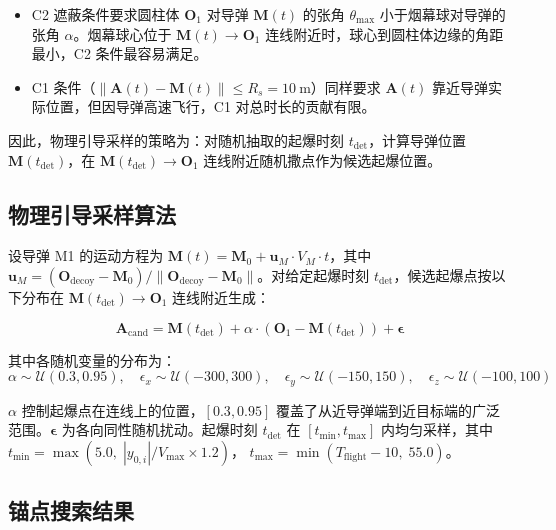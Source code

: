 \documentclass[12pt,a4paper]{ctexart}
\newcommand{\tdet}{t_{\text{det}}}
\begin{document}
\begin{itemize}
    \item C2 遮蔽条件要求圆柱体 $\mathbf{O}_1$ 对导弹 $\mathbf{M}(t)$ 的张角 $\theta_{\max}$ 小于烟幕球对导弹的张角 $\alpha$。烟幕球心位于 $\mathbf{M}(t) \to \mathbf{O}_1$ 连线附近时，球心到圆柱体边缘的角距最小，C2 条件最容易满足。
    \item C1 条件（$\|\mathbf{A}(t) - \mathbf{M}(t)\| \leq R_s = 10\ \mathrm{m}$）同样要求 $\mathbf{A}(t)$ 靠近导弹实际位置，但因导弹高速飞行，C1 对总时长的贡献有限。
\end{itemize}

因此，物理引导采样的策略为：对随机抽取的起爆时刻 $\tdet$，计算导弹位置 $\mathbf{M}(\tdet)$，在 $\mathbf{M}(\tdet) \to \mathbf{O}_1$ 连线附近随机撒点作为候选起爆位置。

\subsection{物理引导采样算法}

设导弹 M1 的运动方程为 $\mathbf{M}(t) = \mathbf{M}_0 + \mathbf{u}_M \cdot V_M \cdot t$，其中 $\mathbf{u}_M = (\mathbf{O}_{\text{decoy}} - \mathbf{M}_0) / \|\mathbf{O}_{\text{decoy}} - \mathbf{M}_0\|$。对给定起爆时刻 $\tdet$，候选起爆点按以下分布在 $\mathbf{M}(\tdet) \to \mathbf{O}_1$ 连线附近生成：

\begin{equation}
\boxed{\mathbf{A}_{\text{cand}} = \mathbf{M}(\tdet) + \alpha \cdot (\mathbf{O}_1 - \mathbf{M}(\tdet)) + \boldsymbol{\epsilon}}
\label{eq:guided-sample}
\end{equation}

其中各随机变量的分布为：
\begin{equation}
\alpha \sim \mathcal{U}(0.3, 0.95), \quad
\epsilon_x \sim \mathcal{U}(-300, 300), \quad
\epsilon_y \sim \mathcal{U}(-150, 150), \quad
\epsilon_z \sim \mathcal{U}(-100, 100)
\end{equation}

$\alpha$ 控制起爆点在连线上的位置，$[0.3, 0.95]$ 覆盖了从近导弹端到近目标端的广泛范围。$\boldsymbol{\epsilon}$ 为各向同性随机扰动。起爆时刻 $\tdet$ 在 $[t_{\min}, t_{\max}]$ 内均匀采样，其中
$t_{\min} = \max(5.0,\; |y_{0,i}| / V_{\max} \times 1.2)$，
$t_{\max} = \min(T_{\text{flight}} - 10,\; 55.0)$。

\subsection{锚点搜索结果}
\end{document}
